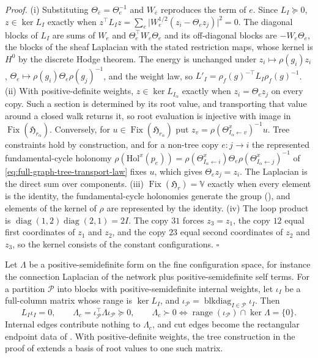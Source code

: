 \noindent\emph{Proof.}
(i) Substituting $\Theta_{\bar e}=\Theta_e^{-1}$ and $W_{\bar e}$ reproduces the term of $e$. Since
$L_I\succeq0$, $z\in\ker L_I$ exactly when $z^\top L_Iz=\sum_e\lvert W_e^{1/2}(z_i-\Theta_ez_j)\rvert^2=0$. The
diagonal blocks of $L_I$ are sums of $W_e$ and $\Theta_e^\top W_e\Theta_e$ and its off-diagonal blocks are
$-W_e\Theta_e$, the blocks of the sheaf Laplacian with the stated restriction maps, whose kernel is $H^0$ by
the discrete Hodge theorem. The energy is unchanged under $z_i\mapsto\rho(g_i)z_i$,
$\Theta_e\mapsto\rho(g_i)\Theta_e\rho(g_j)^{-1}$, and the weight law, so
$L'_I=\rho_f(g)^{-\top}L_I\rho_f(g)^{-1}$. (ii) With positive-definite weights, $z\in\ker L_{I_\alpha}$ exactly
when $z_i=\Theta_ez_j$ on every copy. Such a section is determined by its root value, and transporting that
value around a closed walk returns it, so root evaluation is injective with image in
$\operatorname{Fix}(\mathfrak H_{r_\alpha})$. Conversely, for $u\in\operatorname{Fix}(\mathfrak H_{r_\alpha})$
put $z_v=\rho(\Theta^x_{I_\alpha\leftarrow v})^{-1}u$. Tree constraints hold by construction, and for a
non-tree copy $e:j\to i$ the represented fundamental-cycle holonomy
$\rho(\mathrm{Hol}^x(p_e))=\rho(\Theta^x_{I_\alpha\leftarrow i})\Theta_e\rho(\Theta^x_{I_\alpha\leftarrow j})^{-1}$
of \eqref{eq:full-graph-tree-transport-law} fixes $u$, which gives $\Theta_ez_j=z_i$. The Laplacian is the
direct sum over components. (iii) $\operatorname{Fix}(\mathfrak H_r)=\mathbb V$ exactly when every element is the
identity, the fundamental-cycle holonomies generate the group (), and elements
of the kernel of $\rho$ are represented by the identity. (iv) The loop product is
$\operatorname{diag}(1,2)\operatorname{diag}(2,1)=2I$. The copy $31$ forces $z_3=z_1$, the copy $12$ equal
first coordinates of $z_1$ and $z_2$, and the copy $23$ equal second coordinates of $z_2$ and $z_3$, so the
kernel consists of the constant configurations. $\square$

Let $\Lambda$ be a positive-semidefinite form on the fine configuration space, for instance the connection
Laplacian of the network plus positive-semidefinite self terms. For a partition $\mathcal P$ into blocks
with positive-semidefinite internal weights, let $\iota_I$ be a full-column matrix whose range is
$\ker L_I$, and $\iota_{\mathcal P}=\operatorname{blkdiag}_{I\in\mathcal P}\iota_I$. Then
\begin{equation}
L_I\iota_I=0,
\qquad
\Lambda_c=\iota_{\mathcal P}^\top\Lambda\iota_{\mathcal P}\succeq0,
\qquad
\Lambda_c\succ0\Longleftrightarrow\operatorname{range}(\iota_{\mathcal P})\cap\ker\Lambda=\{0\}.
\label{eq:cg-partial-properness}
\end{equation}
Internal edges contribute nothing to $\Lambda_c$, and cut edges become the rectangular endpoint data of
. With positive-definite weights, the tree construction in the
proof of  extends a basis of root values to one such matrix.

